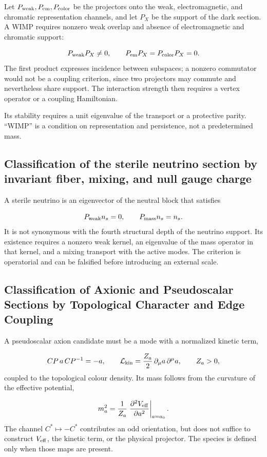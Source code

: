 Let \(P_{\rm weak},P_{\rm em},P_{\rm color}\) be the projectors onto the weak, electromagnetic, and chromatic representation channels, and let \(P_X\) be the support of the dark section. A WIMP requires nonzero weak overlap and absence of electromagnetic and chromatic support:

\[
P_{\rm weak}P_X\ne0,
\qquad
P_{\rm em}P_X=P_{\rm color}P_X=0.
\]
The first product expresses incidence between subspaces; a nonzero commutator would not be a coupling criterion, since two projectors may commute and nevertheless share support. The interaction strength then requires a vertex operator or a coupling Hamiltonian.

Its stability requires a unit eigenvalue of the transport or a protective parity. “WIMP” is a condition on representation and persistence, not a predetermined mass.

\subsection{Classification of the sterile neutrino section by invariant fiber, mixing, and null gauge charge}
A sterile neutrino is an eigenvector of the neutral block that satisfies

\[
P_{\rm weak}n_s=0,
\qquad
P_{\rm mass}n_s=n_s.
\]
It is not synonymous with the fourth structural depth of the neutrino support. Its existence requires a nonzero weak kernel, an eigenvalue of the mass operator in that kernel, and a mixing transport with the active modes. The criterion is operatorial and can be falsified before introducing an external scale.

\subsection{Classification of Axionic and Pseudoscalar Sections by Topological Character and Edge Coupling}
A pseudoscalar axion candidate must be a mode with a normalized kinetic term,

\[
CP\,a\,CP^{-1}=-a,
\qquad
\mathcal L_{\rm kin}=\frac{Z_a}{2}\,\partial_\mu a\,\partial^\mu a,
\qquad Z_a>0,
\]
coupled to the topological colour density. Its mass follows from the curvature of the effective potential,

\[
m_a^2=\frac1{Z_a}
\left.
\frac{\partial^2V_{\rm eff}}{\partial a^2}
\right|_{a=a_0}.
\]
The channel \(C^*\mapsto-C^*\) contributes an odd orientation, but does not
suffice to construct \(V_{\rm eff}\), the kinetic term, or the physical
projector. The species is defined only when those maps are present.

